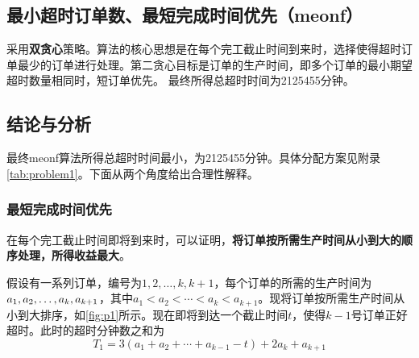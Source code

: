       \subsection{最小超时订单数、最短完成时间优先（meonf）}
      采用\textbf{双贪心}策略。算法的核心思想是在每个完工截止时间到来时，选择使得超时订单最少的订单进行处理。第二贪心目标是订单的生产时间，即多个订单的最小期望超时数量相同时，短订单优先。
      最终所得总超时时间为2125455分钟。
      
      \subsection{结论与分析}
      最终meonf算法所得总超时时间最小，为2125455分钟。具体分配方案见附录\cref{tab:problem1}。下面从两个角度给出合理性解释。
      
      \subsubsection{最短完成时间优先}
      在每个完工截止时间即将到来时，可以证明，\textbf{将订单按所需生产时间从小到大的顺序处理，所得收益最大}。
      
      假设有一系列订单，编号为$1,2,\ldots,k,k+1$，每个订单的所需的生产时间为$a_1,a_2,\ldots,\\a_k,a_{k+1}$，其中$a_1 < a_2 < \cdots < a_k < a_{k+1}$。现将订单按所需生产时间从小到大排序，如\cref{fig:p1}所示。现在即将到达一个截止时间$t$，使得$k-1$号订单正好超时。此时的超时分钟数之和为
\begin{equation}
    \label{eq:p1} 
    T_1=3(a_1+a_2+\cdots+a_{k-1}-t)+2a_k+a_{k+1}
\end{equation}
      
